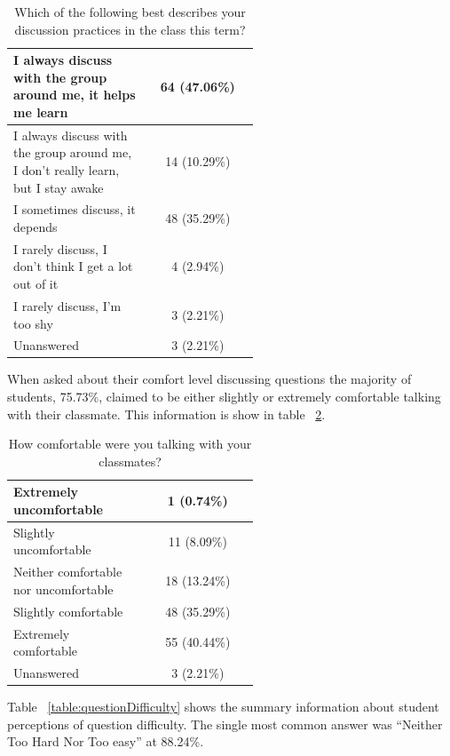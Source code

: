 \documentclass[12pt]{article}
\begin{document}
\begin{table}[ht]
\caption{Which of the following best describes your discussion practices in the class this term?}
\begin{tabular}{p{0.55\linewidth}|c} %
\toprule
 \rowcolor{LightGray} 
 I always discuss with the group around me, it helps me learn & 64 (47.06\%)\\\midrule 
 I always discuss with the group around me, I don't really learn, but I stay awake & 14 (10.29\%)\\\midrule 
 \rowcolor{LightGray}
 I sometimes discuss, it depends & 48 (35.29\%)\\\midrule 
 I rarely discuss, I don't think I get a lot out of it & 4 (2.94\%)\\\midrule 
 \rowcolor{LightGray}
 I rarely discuss, I'm too shy & 3 (2.21\%)\\\midrule 
 Unanswered & 3 (2.21\%)\\\bottomrule 
\end{tabular}
\label{table:groupDiscussion}
\end{table}

When asked about their comfort level discussing questions the majority of students, 75.73\%, claimed to be either slightly or extremely comfortable talking with their classmate. This information is show in table ~\ref{table:group_comfort}.

\begin{table}[ht]
\caption{How comfortable were you talking with your classmates?}
\begin{tabular}{p{0.55\linewidth}|c} %
\toprule
 \rowcolor{LightGray} 
 Extremely uncomfortable & 1 (0.74\%)\\\midrule 
 Slightly uncomfortable & 11 (8.09\%)\\\midrule 
 \rowcolor{LightGray}
 Neither comfortable nor uncomfortable & 18 (13.24\%)\\\midrule 
 Slightly comfortable & 48 (35.29\%)\\\midrule 
 \rowcolor{LightGray}
 Extremely comfortable & 55 (40.44\%)\\\midrule 
 Unanswered & 3 (2.21\%)\\\bottomrule 
\end{tabular}
\label{table:group_comfort}
\end{table}

Table ~\ref{table:questionDifficulty} shows the summary information about student perceptions of question difficulty. The single most common answer was ``Neither Too Hard Nor Too easy'' at 88.24\%. 
\end{document}
